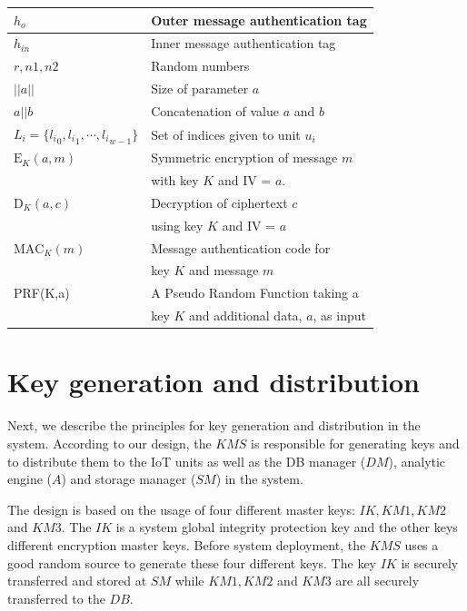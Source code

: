 {\begin{table}[th]
\begin{tabular}{||l|l||}
$h_o$ & Outer message authentication tag \\ \hline
$h_{in}$ & Inner message authentication tag \\ \hline
$r,n1,n2$ & Random numbers \\ \hline
$||a|| $ & Size of parameter $a$\\ \hline
$a||b$ & Concatenation of value $a$ and $b$ \\ \hline
$L_i = \{{l_i}_0, {l_i}_1,\cdots, {l_i}_{w-1}\}$ & Set of indices given to unit $u_i$ \\ \hline
$\text{E}_K(a,m)$ & Symmetric encryption of message $m$ \\
& with key $K$ and IV = $a$. \\ \hline
$\text{D}_{K}(a,c)$ & Decryption of ciphertext $c$ \\
& using key $K$ and IV = $a$\\ \hline
$\text{MAC}_K(m)$ & Message authentication code for \\
& key $K$ and message $m$ \\ \hline
PRF(K,a) & A Pseudo Random Function taking a \\ 
& key $K$ and additional data, $a$, as input \\ \hline
\end{tabular}
\end{table}

\graphicspath{{KeyManagement/images/}}
\section{Key generation and distribution}
\label{keymanagement}
Next, we describe the principles for key generation and distribution in the system. According to our design, the $KMS$ is responsible for generating keys and to distribute them to the IoT units as well as the DB manager ($DM$), analytic engine ($A$) and storage manager ($SM$) in the system. 

The design is based on the usage of four different master keys: $IK, KM1, KM2$ and $KM 3$. The $IK$ is a system global integrity protection key and the other keys different encryption master keys. Before system deployment, the $KMS$ uses a good random source to generate these four different keys. The key $IK$ is securely transferred and stored at $SM$ while $KM1, KM2$ and $KM3$ are all securely transferred to the $DB$.

}
